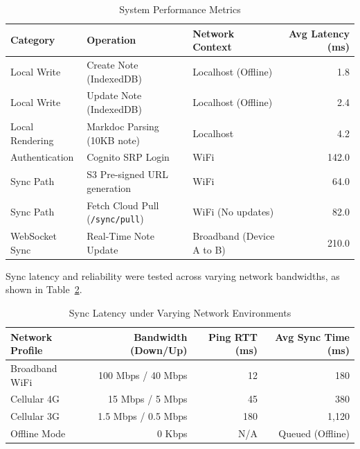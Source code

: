 \documentclass[12pt, a4paper, oneside]{report}
\begin{document}
\begin{table}[H]
\centering
\caption{System Performance Metrics}
\label{tab:perf-metrics}
\begin{tabular}{lllr}
\toprule
\textbf{Category} & \textbf{Operation} & \textbf{Network Context} & \textbf{Avg Latency (ms)} \\
\midrule
Local Write & Create Note (IndexedDB) & Localhost (Offline) & 1.8 \\
Local Write & Update Note (IndexedDB) & Localhost (Offline) & 2.4 \\
Local Rendering & Markdoc Parsing (10KB note) & Localhost & 4.2 \\
Authentication & Cognito SRP Login & WiFi & 142.0 \\
Sync Path & S3 Pre-signed URL generation & WiFi & 64.0 \\
Sync Path & Fetch Cloud Pull (\texttt{/sync/pull}) & WiFi (No updates) & 82.0 \\
WebSocket Sync & Real-Time Note Update & Broadband (Device A to B) & 210.0 \\
\bottomrule
\end{tabular}
\end{table}

Sync latency and reliability were tested across varying network bandwidths, as shown in Table~\ref{tab:network-latencies}.

\begin{table}[H]
\centering
\caption{Sync Latency under Varying Network Environments}
\label{tab:network-latencies}
\begin{tabular}{lrrr}
\toprule
\textbf{Network Profile} & \textbf{Bandwidth (Down/Up)} & \textbf{Ping RTT (ms)} & \textbf{Avg Sync Time (ms)} \\
\midrule
Broadband WiFi & 100 Mbps / 40 Mbps & 12 & 180 \\
Cellular 4G & 15 Mbps / 5 Mbps & 45 & 380 \\
Cellular 3G & 1.5 Mbps / 0.5 Mbps & 180 & 1,120 \\
Offline Mode & 0 Kbps & N/A & Queued (Offline) \\
\bottomrule
\end{tabular}
\end{table}
\end{document}

